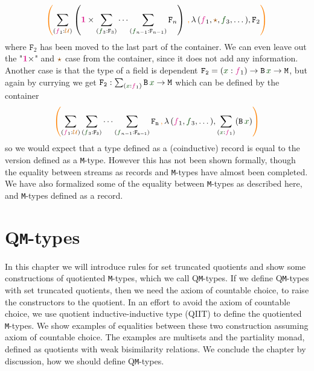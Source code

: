 \documentclass[twoside,11pt,openright]{report}
\theoremstyle{plain} %
\theoremstyle{definition}
\theoremstyle{remark}
\newcommand*{\term}[1]{\textcolor{green!30!black}{#1}} %
\newcommand*{\type}[1]{\textcolor{magenta!90!black}{#1}}
\newcommand*{\containerpair}[2]{\ensuremath{\colorlet{savedleftcolor}{.}\color{orange}\left(\color{savedleftcolor}#1\,\textcolor{orange}{\mathbf{,}}\,#2\color{orange}\right)\color{savedleftcolor}}}
\newcommand*{\universe}[1]{\textcolor{orange!80!black}{#1}}
\newcommand*{\unit}{\type{\textbf{1}}}
\newcommand*{\constant}[1]{\textcolor{orange!60!black}{\ensuremath{\mathtt{#1}}}}
\newcommand*{\typeformer}[1]{\ensuremath{\mathtt{#1}}}
\newcommand*{\unitelem}{\constant{\star}} %
\begin{document}
\begin{equation}
  \containerpair{\sum_{(\type{f}_1 : \universe{\mathcal{U}})} \left(\unit \times \sum_{(\term{f}_3 : \typeformer{F}_3)} \cdots \sum_{(\term{f}_{n-1} : \typeformer{F}_{n-1})}\typeformer{F}_n\right)}{\lambda\,(\type{f}_1,\unitelem,\term{f}_3,\dots),\typeformer{F}_2}
\end{equation}
where \(\typeformer{F}_2\) has been moved to the last part of the container. We can even leave out the "\(\unit \times\)" and \(\unitelem\) case from the container, since it does not add any information. Another case is that the type of a field is dependent \(\typeformer{F_2} = (\term{x} : \type{f}_1) \rightarrow \typeformer{B}\,\term{x} \rightarrow \typeformer{M}\), but again by currying we get \(\typeformer{F_2} : \sum_{(\term{x} : \type{f}_1)} \typeformer{B}\,\term{x} \rightarrow \mathtt{M}\) which can be defined by the container
\begin{equation}
  \containerpair{\sum_{(\type{f}_1 : \universe{\mathcal{U}})} \sum_{(\term{f}_3 : \typeformer{F_3})} \cdots \sum_{(\term{f}_{n-1} : \typeformer{F_{n-1}})}\typeformer{F_n}}{\lambda\,(\type{f}_1,\term{f}_3,\dots),\sum_{(\term{x} : \type{f}_1)} (\typeformer{B}\,\term{x})}
\end{equation}
so we would expect that a type defined as a (coinductive) record is equal to the version defined as a \texttt{M}-type. However this has not been shown formally, though the equality between streams as records and \texttt{M}-types have almost been completed. We have also formalized some of the equality between \texttt{M}-types as described here, and \texttt{M}-types defined as a record. 


\chapter{Q\texttt{M}-types}
\label{ch:QM-types}
In this chapter we will introduce rules for set truncated quotients and show some constructions of quotiented \texttt{M}-types, which we call Q\texttt{M}-types. If we define Q\texttt{M}-types with set truncated quotients, then we need the axiom of countable choice, to raise the constructors to the quotient. In an effort to avoid the axiom of countable choice, we use quotient inductive-inductive type (QIIT) \cite{DBLP:QIIT} to define the quotiented \texttt{M}-types. We show examples of equalities between these two construction assuming axiom of countable choice. The examples are multisets and the partiality monad, defined as quotients with weak bisimilarity relations. We conclude the chapter by discussion, how we should define Q\texttt{M}-types.
\end{document}
